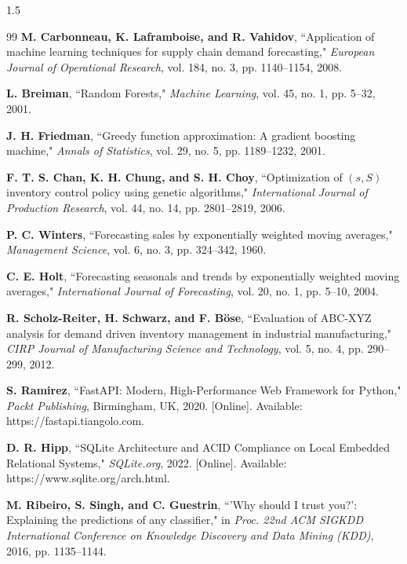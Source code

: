 \begin{spacing}{1.5}
\begin{thebibliography}{99}
 \textbf{M. Carbonneau, K. Laframboise, and R. Vahidov}, ``Application of machine learning techniques for supply chain demand forecasting," \textit{European Journal of Operational Research}, vol. 184, no. 3, pp. 1140--1154, 2008.

 \textbf{L. Breiman}, ``Random Forests," \textit{Machine Learning}, vol. 45, no. 1, pp. 5--32, 2001.

 \textbf{J. H. Friedman}, ``Greedy function approximation: A gradient boosting machine," \textit{Annals of Statistics}, vol. 29, no. 5, pp. 1189--1232, 2001.

 \textbf{F. T. S. Chan, K. H. Chung, and S. H. Choy}, ``Optimization of $(s, S)$ inventory control policy using genetic algorithms," \textit{International Journal of Production Research}, vol. 44, no. 14, pp. 2801--2819, 2006.

 \textbf{P. C. Winters}, ``Forecasting sales by exponentially weighted moving averages," \textit{Management Science}, vol. 6, no. 3, pp. 324--342, 1960.

 \textbf{C. E. Holt}, ``Forecasting seasonals and trends by exponentially weighted moving averages," \textit{International Journal of Forecasting}, vol. 20, no. 1, pp. 5--10, 2004.

 \textbf{R. Scholz-Reiter, H. Schwarz, and F. B\"{o}se}, ``Evaluation of ABC-XYZ analysis for demand driven inventory management in industrial manufacturing," \textit{CIRP Journal of Manufacturing Science and Technology}, vol. 5, no. 4, pp. 290--299, 2012.

 \textbf{S. Ramirez}, ``FastAPI: Modern, High-Performance Web Framework for Python," \textit{Packt Publishing}, Birmingham, UK, 2020. [Online]. Available: https://fastapi.tiangolo.com.

 \textbf{D. R. Hipp}, ``SQLite Architecture and ACID Compliance on Local Embedded Relational Systems," \textit{SQLite.org}, 2022. [Online]. Available: https://www.sqlite.org/arch.html.

 \textbf{M. Ribeiro, S. Singh, and C. Guestrin}, ``'Why should I trust you?': Explaining the predictions of any classifier," in \textit{Proc. 22nd ACM SIGKDD International Conference on Knowledge Discovery and Data Mining (KDD)}, 2016, pp. 1135--1144.

\end{thebibliography}
\end{spacing}
	
\nocite{*}
